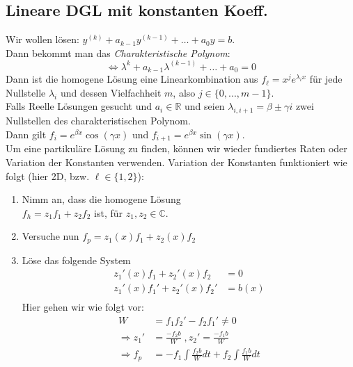 \documentclass[a4paper,10pt]{article}
\begin{document}
\subsection{Lineare DGL mit konstanten Koeff.}
Wir wollen lösen: $y^{(k)}+a_{k-1}y^{(k-1)}+\dots + a_{0}y=b$.\\
Dann bekommt man das \textit{Charakteristische Polynom}:  
$$\iff \lambda^{k}+a_{k-1}\lambda^{(k-1)}+\dots + a_{0}=0$$
Dann ist die homogene Lösung eine Linearkombination aus $f_\ell =x^{j}e^{\lambda_{i}x}$ für jede Nullstelle $\lambda_i$ und dessen Vielfachheit $m$, also $j\in \{ 0,...,m-1 \}$.\\
Falls Reelle Lösungen gesucht und $a_i \in \mathbb{R}$ und seien $\lambda_{i,i+1} =\beta \pm \gamma i$ zwei Nullstellen des charakteristischen Polynom. \\Dann gilt $f_{i}=e^{\beta x}\cos (\gamma x)$ und $f_{i+1}=e^{\beta x}\sin (\gamma x)$.\\

Um eine partikuläre Lösung zu finden, können wir wieder fundiertes Raten oder Variation der Konstanten verwenden. 
Variation der Konstanten funktioniert wie folgt (hier 2D, bzw. $\ell\in \{1,2\}$):

\begin{enumerate}[label=(\arabic*)]
	\item Nimm an, dass die homogene Lösung \\
	$f_h = z_1 f_1 + z_2 f_2$ ist, für $z_1, z_2 \in \mathbb C$.
	\item Versuche nun $f_p = z_1(x) f_1 + z_2(x) f_2$
	\item Löse das folgende System
	      \begin{align*}
	      	z_1'(x) f_1 + z_2'(x) f_2   & = 0    \\
	      	z_1'(x) f_1' + z_2'(x) f_2' & = b(x) \\
	      \end{align*}
	      Hier gehen wir wie folgt vor:
	      \begin{align*}
	      	W                & = f_1 f_2' - f_2 f_1' \neq 0                                 \\
	      	\Rightarrow z_1' & = \frac{-f_2 b}{W} \; , z_2' = \frac{-f_1 b}{W}              \\
	      	\Rightarrow f_p  & = -f_1 \int \frac{f_2 b}{W} dt + f_2 \int \frac{f_1 b}{W} dt 
	      \end{align*}
\end{enumerate}
\end{document}
